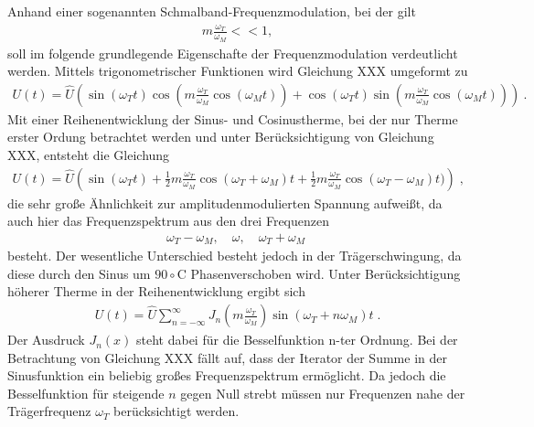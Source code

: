 Anhand einer sogenannten Schmalband-Frequenzmodulation, bei der gilt 
\begin{align}
	m\frac{\omega_T}{\omega_M}<<1,
\end{align}
soll im folgende grundlegende Eigenschafte der Frequenzmodulation verdeutlicht werden. Mittels trigonometrischer Funktionen wird Gleichung XXX umgeformt zu
\begin{align}
	U(t)=\hat{U}\left(\sin{(\omega_Tt)}\cos{\left(m\frac{\omega_T}{\omega_M}\cos{(\omega_Mt)}\right)} + \cos{(\omega_Tt)}\sin{\left(m\frac{\omega_T}{\omega_M}\cos{(\omega_Mt)}\right)}\right) \:.
\end{align}
Mit einer Reihenentwicklung der Sinus- und Cosinustherme, bei der nur Therme erster Ordung betrachtet werden und  unter Berücksichtigung von Gleichung XXX, entsteht die Gleichung
\begin{align}
	U(t)=\hat{U}\left(\sin{(\omega_Tt)+\frac{1}{2}m\frac{\omega_T}{\omega_M}\cos{(\omega_T+\omega_M)t}}+\frac{1}{2}m\frac{\omega_T}{\omega_M}\cos{(\omega_T-\omega_M)t})\right)\;,
\end{align}
die sehr große Ähnlichkeit zur amplitudenmodulierten Spannung aufweißt, da auch hier das Frequenzspektrum aus den drei Frequenzen
\begin{align}
	\omega_T-\omega_M,\quad\omega,\quad\omega_T+\omega_M\;
\end{align}
besteht. Der wesentliche Unterschied besteht jedoch in der Trägerschwingung, da diese durch den Sinus um $90\circ\text{C}$ Phasenverschoben wird.
Unter Berücksichtigung höherer Therme in der Reihenentwicklung ergibt sich 
\begin{align}
	U(t)=\hat{U}\sum_{n=-\infty}^{\infty} J_n\left(m\frac{\omega_T}{\omega_M}\right)\sin{(\omega_T+n\omega_M)}t\;. 
\end{align}
Der Ausdruck $J_n(x)$ steht dabei für die Besselfunktion n-ter Ordnung. Bei der Betrachtung von Gleichung XXX fällt auf, dass der Iterator der Summe in der Sinusfunktion ein beliebig großes Frequenzspektrum ermöglicht. Da jedoch die Besselfunktion für steigende $n$ gegen Null strebt müssen nur Frequenzen nahe der Trägerfrequenz $\omega_T$ berücksichtigt werden.



